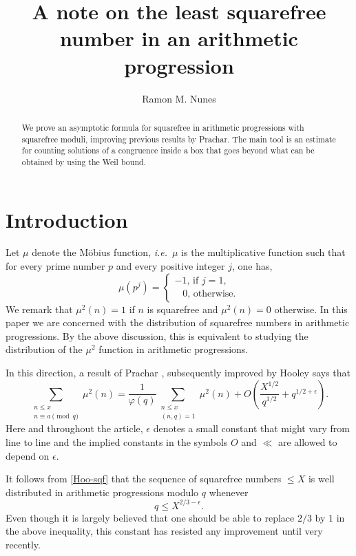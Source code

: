 \documentclass[a4paper, 11pt]{amsart}
\title[On the least squarefree number in an arithmetic progression]{A note on the least squarefree number in an arithmetic progression}
\author{Ramon M. Nunes} \thanks{This work is supported by the DFG-SNF lead agency program grant 200021L-153647.}
\theoremstyle{plain}
\theoremstyle{definition}
\newcommand{\rmod}{\!\!\!\!\pmod}
\begin{document}
\maketitle

\begin{abstract}
We prove an asymptotic formula for squarefree in arithmetic progressions with squarefree moduli, improving previous results by Prachar. The main tool is  an estimate for counting solutions of a congruence inside a box that goes beyond what can be obtained by using the Weil bound.
\end{abstract}

\section{Introduction}


Let $\mu$ denote the M\"obius function, \textit{i.e.}~$\mu$ is the multiplicative function such that for every prime number $p$ and every positive integer $j$, one has,
%
$$
\mu(p^{j})=
\begin{cases}
-1,\,\text{if }j=1,\\
\;\;\;0,\,\text{otherwise}.
\end{cases}
$$
%
We remark that $\mu^2(n)=1$ if $n$ is squarefree and $\mu^2(n)=0$ otherwise. In this paper we are concerned with the distribution of squarefree numbers in arithmetic progressions. By the above discussion, this is equivalent to studying the distribution of the $\mu^2$ function in arithmetic progressions.

In this direction, a result of Prachar \citep{prachar1958kleinste}, subsequently improved by Hooley \citep{hooley1975note} says that
%
\begin{equation}\label{Hoo-sqf}
\sum_{\substack{n\leq x\\n \equiv a\rmod q}}\mu^2(n) = \frac{1}{\varphi(q)}\sum_{\substack{n\leq x\\(n,q)=1}}\mu^2(n) + O\left(\frac{X^{1/2}}{q^{1/2}} + q^{1/2+\epsilon}\right).
\end{equation}
%
Here and throughout the article, $\epsilon$ denotes a small constant that might vary from line to line and the implied constants in the symbols $O$ and $\ll$ are allowed to depend on $\epsilon$.

It follows from \eqref{Hoo-sqf} that the sequence of squarefree numbers $\leq X$ is well distributed in arithmetic progressions modulo $q$ whenever
%
\begin{equation}\label{q<X23}
q\leq X^{2/3-\epsilon}.
\end{equation}
%
Even though it is largely believed that one should be able to replace $2/3$ by $1$ in the above inequality, this constant has resisted any improvement until very recently.
\end{document}
